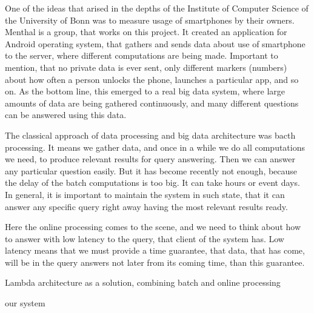 One of the ideas that arised in the depths of the Institute of Computer Science of the University of Bonn was to measure usage of smartphones by their owners.
Menthal is a group, that works on this project.
It created an application for Android operating system, that gathers and sends data about use of smartphone to the server, where different computations are being made.
Important to mention, that no private data is ever sent, only different markers (numbers) about how often a person unlocks the phone, launches a particular app, and so on.
As the bottom line, this emerged to a real big data system, where large amounts of data are being gathered continuously, and many different questions can be answered using this data.

The classical approach of data processing and big data architecture was bacth processing.
It means we gather data, and once in a while we do all computations we need, to produce relevant results for query answering.
Then we can answer any particular question easily.
But it has become recently not enough, because the delay of the batch computations is too big.
It can take hours or event days.
In general, it is important to maintain the system in such state, that it can answer any specific query right away having the most relevant results ready.

Here the online processing comes to the scene, and we need to think about how to answer with low latency to the query, that client of the system has.
Low latency means that we must provide a time guarantee, that data, that has come, will be in the query answers not later from its coming time, than this guarantee.


Lambda architecture as a solution, combining batch and online processing

our system